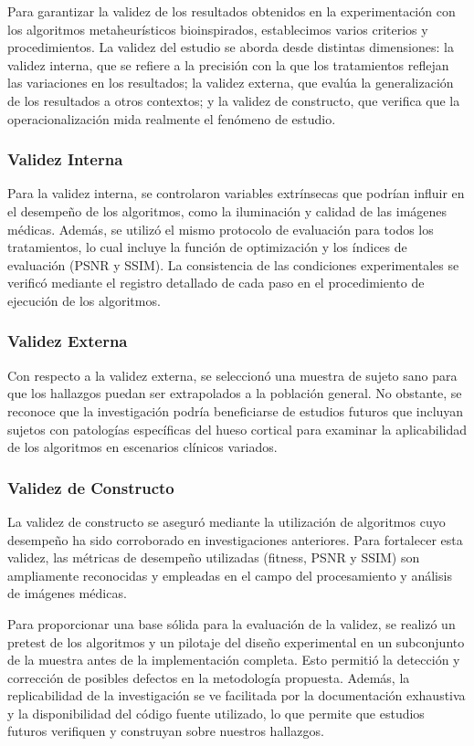 \documentclass[conference]{IEEEtran}
\begin{document}
\noindent Para garantizar la validez de los resultados obtenidos en la experimentación con los algoritmos metaheurísticos bioinspirados, establecimos varios criterios y procedimientos. La validez del estudio se aborda desde distintas dimensiones: la validez interna, que se refiere a la precisión con la que los tratamientos reflejan las variaciones en los resultados; la validez externa, que evalúa la generalización de los resultados a otros contextos; y la validez de constructo, que verifica que la operacionalización mida realmente el fenómeno de estudio.

\subsubsection{Validez Interna}
\noindent Para la validez interna, se controlaron variables extrínsecas que podrían influir en el desempeño de los algoritmos, como la iluminación y calidad de las imágenes médicas. Además, se utilizó el mismo protocolo de evaluación para todos los tratamientos, lo cual incluye la función de optimización y los índices de evaluación (PSNR y SSIM). La consistencia de las condiciones experimentales se verificó mediante el registro detallado de cada paso en el procedimiento de ejecución de los algoritmos.

\subsubsection{Validez Externa}
\noindent Con respecto a la validez externa, se seleccionó una muestra de sujeto sano para que los hallazgos puedan ser extrapolados a la población general. No obstante, se reconoce que la investigación podría beneficiarse de estudios futuros que incluyan sujetos con patologías específicas del hueso cortical para examinar la aplicabilidad de los algoritmos en escenarios clínicos variados.

\subsubsection{Validez de Constructo}
\noindent La validez de constructo se aseguró mediante la utilización de algoritmos cuyo desempeño ha sido corroborado en investigaciones anteriores. Para fortalecer esta validez, las métricas de desempeño utilizadas (fitness, PSNR y SSIM) son ampliamente reconocidas y empleadas en el campo del procesamiento y análisis de imágenes médicas.

\noindent Para proporcionar una base sólida para la evaluación de la validez, se realizó un pretest de los algoritmos y un pilotaje del diseño experimental en un subconjunto de la muestra antes de la implementación completa. Esto permitió la detección y corrección de posibles defectos en la metodología propuesta. Además, la replicabilidad de la investigación se ve facilitada por la documentación exhaustiva y la disponibilidad del código fuente utilizado, lo que permite que estudios futuros verifiquen y construyan sobre nuestros hallazgos.
\end{document}
